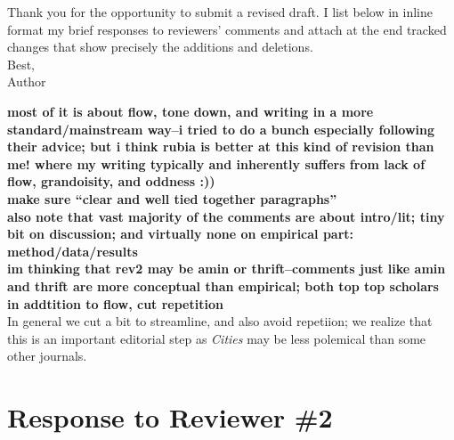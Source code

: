 \noindent Thank you for the opportunity to submit a revised draft.
I list below in inline format my brief responses to reviewers'
 comments and attach at the end tracked changes that
 show precisely the additions and deletions.\\

\noindent Best,\\
Author 
\vspace{.5in}






\textbf{most of it is about flow, tone down, and writing in a more
  standard/mainstream way--i tried to do a bunch especially following their
  advice; but i think rubia is better at this kind of revision than me! where my
writing typically and inherently suffers from lack of flow, grandoisity, and
oddness :))}\\


\textbf{make sure ``clear and well tied together paragraphs''}\\

\textbf{also note that vast majority of the comments are about intro/lit; tiny
  bit on discussion; and virtually none on empirical part: method/data/results}\\


\textbf{im thinking that rev2 may be amin or thrift--comments just like amin and
  thrift are more conceptual than empirical; both top top scholars}\\

\textbf{in addtition to flow, cut repetition}\\

In general we cut a bit to streamline, and also avoid repetiion; we realize that
this is an important editorial step as \textit{Cities} may be less polemical
than some other journals.  

\newpage
\section{Response to Reviewer \#2} 


